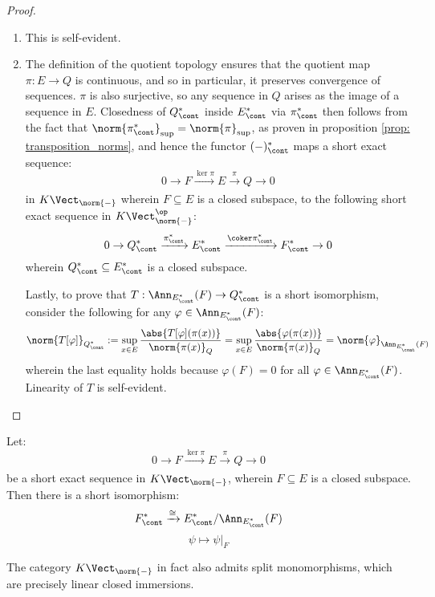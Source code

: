             \begin{proof}
                \begin{enumerate}
                    \item This is self-evident.
                    \item The definition of the quotient topology ensures that the quotient map $\pi: E \to Q$ is continuous, and so in particular, it preserves convergence of sequences. $\pi$ is also surjective, so any sequence in $Q$ arises as the image of a sequence in $E$. Closedness of $Q^*_{\cont}$ inside $E_{\cont}^*$ via $\pi_{\cont}^*$ then follows from the fact that $\norm{\pi^*_{\cont}}_{\sup} = \norm{\pi}_{\sup}$, as proven in proposition \ref{prop: transposition_norms}, and hence the functor $(-)^*_{\cont}$ maps a short exact sequence:
                        $$0 \to F \xrightarrow[]{\ker \pi} E \xrightarrow[]{\pi} Q \to 0$$
                    in $K\-\Vect_{\norm{-}}$ wherein $F \subseteq E$ is a closed subspace, to the following short exact sequence in $K\-\Vect_{\norm{-}}^{\op}$:
                        $$0 \to Q^*_{\cont} \xrightarrow[]{\pi^*_{\cont}} E^*_{\cont} \xrightarrow[]{\coker \pi^*_{\cont}} F^*_{\cont} \to 0$$
                    wherein $Q^*_{\cont} \subseteq E^*_{\cont}$ is a closed subspace.

                    Lastly, to prove that $T: \Ann_{E^*_{\cont}}(F) \to Q^*_{\cont}$ is a short isomorphism, consider the following for any $\varphi \in \Ann_{E^*_{\cont}}(F)$:
                        $$\norm{T[\varphi]}_{Q^*_{\cont}} := \sup_{x \in E} \frac{ \abs{T[\varphi]( \pi(x) )} }{ \norm{\pi(x)}_Q } = \sup_{x \in E} \frac{ \abs{\varphi(\pi(x))} }{ \norm{\pi(x)}_Q } = \norm{\varphi}_{\Ann_{E^*_{\cont}}(F)}$$
                    wherein the last equality holds because $\varphi(F) = 0$ for all $\varphi \in \Ann_{E^*_{\cont}}(F)$. Linearity of $T$ is self-evident.
                \end{enumerate}
            \end{proof}
        \begin{corollary}
            Let:
                $$0 \to F \xrightarrow[]{\ker \pi} E \xrightarrow[]{\pi} Q \to 0$$
            be a short exact sequence in $K\-\Vect_{\norm{-}}$, wherein $F \subseteq E$ is a closed subspace. Then there is a short isomorphism:
                $$F^*_{\cont} \xrightarrow[]{\cong} E^*_{\cont}/\Ann_{E^*_{\cont}}(F)$$
                $$\psi \mapsto \psi|_F$$
        \end{corollary}
        \begin{proposition} \label{prop: split_monomorphisms_of_normed_spaces}
            The category $K\-\Vect_{\norm{-}}$ in fact also admits split monomorphisms, which are precisely linear closed immersions.
        \end{proposition}
